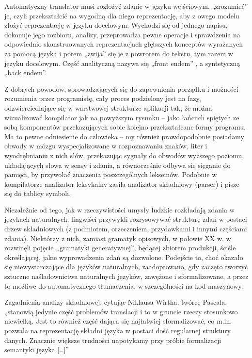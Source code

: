 Automatyczny translator musi rozłożyć zdanie w języku wejściowym, „zrozumieć” je, czyli przekształcić na wygodną dla niego reprezentację, aby z owego modelu złożyć reprezentację w języku docelowym. Wychodzi się od jednego napisu, dokonuje jego rozbioru, analizy, przeprowadza pewne operacje i sprawdzenia na odpowiednio skonstruowanych reprezentacjach głębszych konceptów wyrażanych za pomocą języka i potem „zwija” się je z powrotem do tekstu, tym razem w języku docelowym. Część analityczną nazywa się „front endem” , a syntetyczną „back endem”.\cite[str.~4]{DRAGON_BOOK}

Z dobrych powodów, sprowadzających się do zapewnienia porządku i możności rozumienia przez programistę, cały proces podzielony jest na fazy, odzwierciedlające się w warstwowej strukturze aplikacji tak, że można wizualizować kompilator jak na powyższym rysunku – jako łańcuch spiętych ze sobą komponentów przekazujących sobie kolejno przekształcane formy programu. Ma to pewne odniesienie do człowieka – my również prawdopodobnie posiadamy obwody w mózgu wyspecjalizowane w rozpoznawaniu znaków, liter i wyodrębnianiu z nich słów, przekazując sygnały do obwodów wyższego poziomu, układających słowa w sensy i zdania, a równocześnie odbywa się sięganie do pamięci, by przywołać znaczenia poszczególnych leksemów. Podobnie w kompilatorze analizator leksykalny zasila analizator składniowy (parser) i pisze się do tablicy symboli.

Niezależnie od tego, jak w rzeczywistości umysły ludzkie rozkładają zdania w językach naturalnych, lingwiści przywykli rozrysowywać strukturę zdań w postaci drzew składniowych (z podmiotem, orzeczeniem, przydawkami i innymi częściami zdania). Niektórzy z nich, zamiast gramatyk opisowych, w połowie XX w. w rozwinęli pojęcie „gramatyki generatywnej”, będącej zbiorem produkcji, ściśle określającej, jakie wyprowadzenia zdań są dozwolone.\cite{Chomsky1956} Podejście to, choć okazało się niewystarczające dla języków naturalnych, zaadoptowano, gdy zaczęto tworzyć sztuczne naśladownictwa naturalnych języków, zawężone i sformalizowane, a przez to możliwe do automatycznego tłumaczenia, w szczególności na kod maszynowy. 

Zagadnienia analizy składniowej,  cytując Niklausa Wirtha, twórcę Pascala, „stanowią jedynie część problemów translacji i to w gruncie rzeczy stosunkowo niewielką. Jest to również część dająca się najłatwiej sformalizować, co m.in. pozwala na reprezentację składni języka w postaci dość regularnej struktury danych. Znacznie większe trudności napotykamy przy próbie formalizacji semantyki języka […]” \cite[str.~317]{wirth_alogorytmy_struktury_danych}

